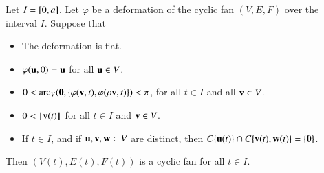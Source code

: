 \begin{lemma} \label{lemma:cyclic-fan-deform}
Let $I = [ 0,a]$.  Let $\varphi$ be a deformation of the cyclic fan $(V,E,F)$ over
the interval $I$.    Suppose that 
\begin{itemize}
\item The deformation is flat.
\item $\varphi({\mathbf u},0)={\mathbf u}$ for all ${\mathbf u}\in V$. 
\item $0 < \operatorname{arc}_V({\mathbf 0},\{\varphi({\mathbf v},t),\varphi(\rho {\mathbf v},t)\}) < \pi$, for all $t\in I$ and all ${\mathbf v}\in V$.
\item $0 < {{\hskip0.1em|\hskip-0.15em|\hskip0.1em}{\mathbf v}(t){\hskip0.1em|\hskip-0.15em|\hskip0.1em}}$ for all $t\in I$ and ${\mathbf v}\in V$.
\item If $t\in I$, and if ${\mathbf u},{\mathbf v},{\mathbf w}\in V$ are distinct, 
then $C\{{\mathbf u}(t)\}\cap C\{{\mathbf v}(t),{\mathbf w}(t)\} = \{{\mathbf 0}\}$.
\end{itemize}
Then $(V(t),E(t),F(t))$ is a cyclic fan for all $t\in I$.
\end{lemma}
%
%

